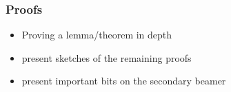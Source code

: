 \begin{frame}
	\frametitle{Proofs}

	\begin{itemize}
		\item Proving a lemma/theorem in depth
		\item present sketches of the remaining proofs
		\item present important bits on the secondary beamer
	\end{itemize}
\end{frame}